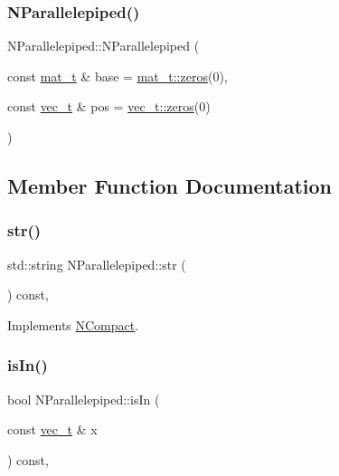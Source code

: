 \subsubsection{\texorpdfstring{NParallelepiped()}{NParallelepiped()}}
{\footnotesize\ttfamily N\+Parallelepiped\+::\+N\+Parallelepiped (\begin{DoxyParamCaption}\item[{const \mbox{\hyperlink{_n_p_matrix_8h_a44dfb60c1e03b44e98a332fb2ae71947}{mat\+\_\+t}} \&}]{base = {\ttfamily \mbox{\hyperlink{class_n_p_matrix_a701c8f60b4b8b727fccb063cd6f0784b}{mat\+\_\+t\+::zeros}}(0)},  }\item[{const \mbox{\hyperlink{_n_vector_8h_a0a2cfc67e738a3d73e4f12098c4c07f6}{vec\+\_\+t}} \&}]{pos = {\ttfamily \mbox{\hyperlink{class_n_vector_a6253cef3c39dd9d388bbf7d17069bc51}{vec\+\_\+t\+::zeros}}(0)} }\end{DoxyParamCaption})}



\subsection{Member Function Documentation}
\mbox{\label{class_n_parallelepiped_a2f5b58b9b80e9b3fda4177fb7703b221}} 
\subsubsection{\texorpdfstring{str()}{str()}}
{\footnotesize\ttfamily std\+::string N\+Parallelepiped\+::str (\begin{DoxyParamCaption}{ }\end{DoxyParamCaption}) const\hspace{0.3cm}{\ttfamily [override]}, {\ttfamily [virtual]}}



Implements \mbox{\hyperlink{class_n_compact_af1879d7342bf6d9902ed5473f6e89038}{N\+Compact}}.

\mbox{\label{class_n_parallelepiped_abe05e06f34b0be7d18c098ef7821edf3}} 
\subsubsection{\texorpdfstring{isIn()}{isIn()}}
{\footnotesize\ttfamily bool N\+Parallelepiped\+::is\+In (\begin{DoxyParamCaption}\item[{const \mbox{\hyperlink{_n_vector_8h_a0a2cfc67e738a3d73e4f12098c4c07f6}{vec\+\_\+t}} \&}]{x }\end{DoxyParamCaption}) const\hspace{0.3cm}{\ttfamily [override]}, {\ttfamily [virtual]}}




